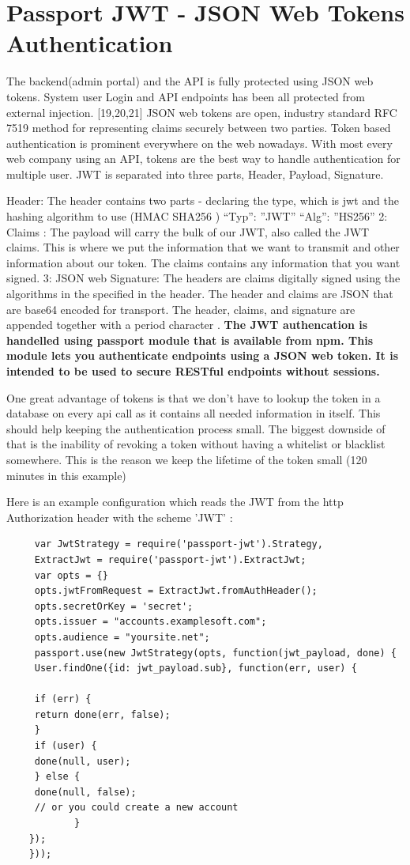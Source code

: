 		\section{Passport JWT - JSON Web Tokens Authentication}
		The backend(admin portal) and the API is fully protected using JSON web tokens. System user Login and API endpoints has been all protected from external injection.  \cite{AnatomyOfJWT} \cite{IETFRFC} \cite{DraftIETAOAUTH} [19,20,21] JSON web tokens are open, industry standard RFC 7519 method for representing claims securely between two parties.  Token based authentication is prominent everywhere on the web nowadays. With most every web company using an API, tokens are the best way to handle authentication for multiple user. JWT is separated into three parts, Header, Payload,  Signature.
		
		 Header: The header contains two parts - declaring the type, which is jwt and the hashing algorithm to use (HMAC SHA256 )
		 {
		 	“Typ”: ”JWT”
		 	“Alg”: ”HS256”
		 }
		 2: Claims :  The payload will carry the bulk of our JWT, also called the JWT claims\cite{AnatomyOfJWT}. This is where we put the information that we want to transmit and other information about our token. The claims contains any information that you want signed\cite{StormpathJWT}.
		 3: JSON web Signature: The headers are claims digitally signed using the algorithms in the specified in the header.  The header and claims are JSON that are base64 encoded for transport. The header, claims, and signature are appended together with a period character \cite{IETFRFC}
		 \cite{DraftIETAOAUTH}. \textbf{The JWT authencation is handelled using passport module that is available from npm. This module lets you authenticate endpoints using a JSON web token. It is intended to be used to secure RESTful endpoints without sessions.}
		 
		 
	\cite{HyphemeJWT} One great advantage of tokens is that we don't have to lookup the token in a database on every api call as it contains all needed information in itself. This should help keeping the authentication process small. The biggest downside of that is the inability of revoking a token without having a whitelist or blacklist somewhere. This is the reason we keep the lifetime of the token small (120 minutes in this example)
		 
 Here is  an example configuration which reads the JWT from the http Authorization header with the scheme 'JWT' \cite{JWTPassport}:
		 
\begin{verbatim}
	 var JwtStrategy = require('passport-jwt').Strategy,
	 ExtractJwt = require('passport-jwt').ExtractJwt;
	 var opts = {}
	 opts.jwtFromRequest = ExtractJwt.fromAuthHeader();
	 opts.secretOrKey = 'secret';
	 opts.issuer = "accounts.examplesoft.com";
	 opts.audience = "yoursite.net";
	 passport.use(new JwtStrategy(opts, function(jwt_payload, done) {
	 User.findOne({id: jwt_payload.sub}, function(err, user) {
		 
	 if (err) {
	 return done(err, false);
	 }
	 if (user) {
	 done(null, user);
	 } else {
	 done(null, false);
	 // or you could create a new account 
			}
	});
	}));
		 
\end{verbatim}

